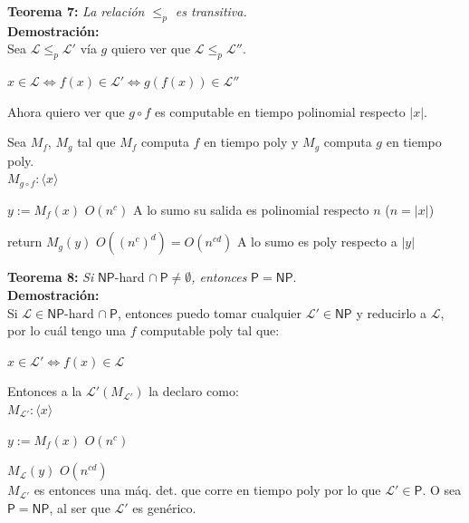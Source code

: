 \documentclass{article}
\begin{document}
\begin{flushleft}
  \textbf{Teorema 7:}
  \textit{La relación $\leq_p$ es transitiva.} \\[0.5em]

  \textbf{\textcolor{Mulberry}{Demostración:}} \\[0.5em]

  Sea $\mathcal{L} \leq_p \mathcal{L'}$ vía $g$ quiero ver que $\mathcal{L} \leq_p \mathcal{L''}$.
\end{flushleft}
\begin{center}
  $x \in \mathcal{L} \iff f(x) \in \mathcal{L'} \iff g(f(x)) \in \mathcal{L''}$
\end{center}
\begin{flushleft}
  Ahora quiero ver que $g \circ f$ es computable en tiempo polinomial respecto $|x|$.

  Sea $M_f$, $M_g$ tal que $M_f$ computa $f$ en tiempo poly y $M_g$ computa $g$ en tiempo poly. \\[0.5em]
  $M_{g \circ f} : \langle x \rangle $

  \quad $y := M_f(x)$ \qquad \textcolor{OliveGreen}{$O(n^c)$ A lo sumo su salida es polinomial respecto $n$ 
  ($n = |x|$)} 

  \quad return  $M_g(y)$ \qquad \textcolor{OliveGreen}{$O((n^c)^d) = O(n^{cd})$ A lo sumo es poly respecto a 
  $|y|$}
\end{flushleft}

\begin{flushleft}
  \textbf{\hypertarget{teo8}{Teorema 8:}}
  \textit{Si }$\mathsf{NP}$-hard $\cap \ \mathsf{P} \neq \emptyset$\textit{, entonces} $\mathsf{P} = 
  \mathsf{NP}$. \\[0.5 em]

  \textbf{\textcolor{Mulberry}{Demostración:}} \\[0.5em]

  Si $\mathcal{L} \in \mathsf{NP}$-hard $\cap \ \mathsf{P}$, entonces puedo tomar cualquier $\mathcal{L'} \in
  \mathsf{NP}$ y reducirlo a $\mathcal{L}$, por lo cuál tengo una $f$ computable poly tal que:
\end{flushleft}
\begin{center}
  $x \in \mathcal{L'} \iff f(x) \in \mathcal{L}$
\end{center}
\begin{flushleft}
  Entonces a la $\mathcal{L'}(M_{\mathcal{L'}})$ la declaro como: \\[0.5em]
  
  $M_{\mathcal{L'}}: \langle x \rangle$
  
  \quad $y := M_f(x)$ \qquad \textcolor{OliveGreen}{$O(n^c)$}

  \quad $M_{\mathcal{L}}(y)$ \qquad \textcolor{OliveGreen}{$O(n^{cd})$} \\[0.5em]

  $M_{\mathcal{L'}}$ es entonces una máq. det. que corre en tiempo poly por lo que $\mathcal{L'} \in 
  \mathsf{P}$. O sea $\mathsf{P} = \mathsf{NP}$, al ser que $\mathcal{L'}$ es genérico.
\end{flushleft}
\end{document}

